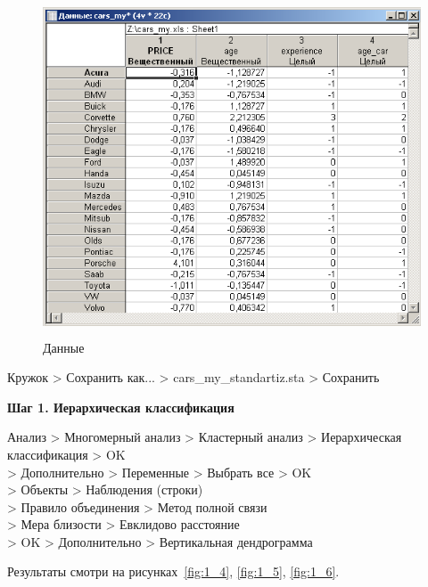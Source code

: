 \begin{figure}[!h]
  \centering

  \includegraphics[height=10cm]
  {inc/cars_my/1.3.PNG}

  \caption{Данные}

  \label{fig:1_3}
\end{figure}

Кружок > Сохранить как... > cars\_my\_standartiz.sta > Сохранить

\newpage

\begin{center}
  \textbf{Шаг 1. Иерархическая классификация}
\end{center}

Анализ > Многомерный анализ > Кластерный анализ > Иерархическая классификация > OK \\
> Дополнительно > Переменные > Выбрать все > OK \\
> Объекты > Наблюдения (строки) \\
> Правило объединения > Метод полной связи \\
> Мера близости > Евклидово расстояние \\
> OK > Дополнительно > Вертикальная дендрограмма

Результаты смотри на рисунках~\ref{fig:1_4}, \ref{fig:1_5}, \ref{fig:1_6}.

